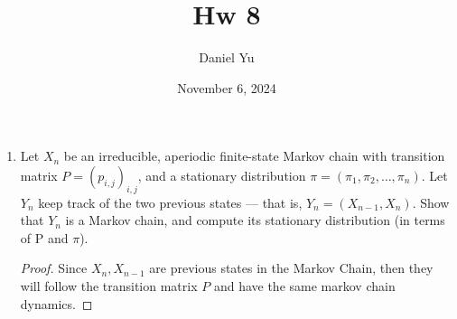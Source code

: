 \documentclass[a4paper]{article}
\title{\Huge{Hw 8}}
\author{\huge{Daniel Yu}}
\date{November 6, 2024}
\begin{document}
\maketitle
\newpage%
\pagebreak
\begin{enumerate}
  \item Let $X_n$ be an irreducible, aperiodic finite-state Markov chain with transition matrix $P =
    (p_{i,j})_{i,j}$, and a stationary distribution $\pi = (\pi_1, \pi_2, \ldots, \pi_n)$. Let $Y_n$ keep track of the two previous states — that is, $Y_n = (X_{n - 1}, X_n)$. Show that $Y_n$ is a Markov chain, and compute its stationary distribution (in terms of P and $\pi$). 
 
    \noindent\hrulefill

    \begin{proof}
      Since $X_n, X_{n - 1}$ are previous states in the Markov Chain, then they will follow the transition matrix $P$ and have the same markov chain dynamics.


\end{proof}
\end{enumerate}
\end{document}

